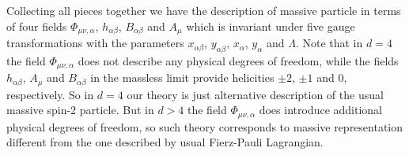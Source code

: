 \documentclass[a4paper,12pt]{article}
\begin{document}
Collecting all pieces together we have the description of massive particle
in terms of four fields $\Phi_{\mu\nu,\alpha}$, $h_{\alpha\beta}$,
$B_{\alpha\beta}$ and $A_\mu$ which is invariant under five gauge
transformations with the parameters $x_{\alpha\beta}$, $y_{\alpha\beta}$,
$x_\alpha$, $y_\alpha$ and $\Lambda$. Note that in $d = 4$ the field
$\Phi_{\mu\nu,\alpha}$ does not describe any physical degrees of freedom,
while the fields $h_{\alpha\beta}$, $A_\mu$ and $B_{\alpha\beta}$ in the
massless limit provide helicities $\pm 2$, $\pm 1$ and 0, respectively.
So in $d = 4$ our theory is just alternative description
of the usual massive spin-2 particle. But in $d > 4$ the field
$\Phi_{\mu\nu,\alpha}$ does introduce additional physical degrees of
freedom, so such theory corresponds to massive representation different
from the one described by usual Fierz-Pauli Lagrangian.
\end{document}
